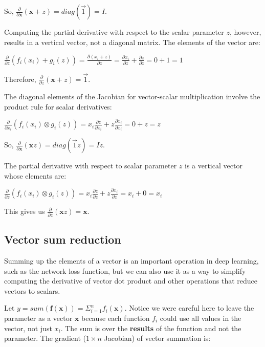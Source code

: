 \documentclass[11pt]{article}
\begin{document}
So, $\frac{\partial}{\partial \mathbf{x}} ( \mathbf{x} + z ) = diag(\vec{1}) = I$.

Computing the partial derivative with respect to the scalar parameter $z$, however, results in a vertical vector, not a diagonal matrix. The elements of the vector are:
 
$\frac{\partial}{\partial z} ( f_i(x_i) + g_i(z) ) = \frac{\partial (x_i + z)}{\partial z} = \frac{\partial x_i}{\partial z} + \frac{\partial z}{\partial z} = 0 + 1 = 1$

Therefore, $\frac{\partial}{\partial z} ( \mathbf{x} + z ) = \vec{1}$.

The diagonal elements of the Jacobian for vector-scalar multiplication involve the product rule for scalar derivatives:

$\frac{\partial}{\partial x_i} ( f_i(x_i) \otimes g_i(z) ) = x_i  \frac{\partial z}{\partial x_i} + z  \frac{\partial x_i}{\partial x_i} = 0 + z = z$

So, $\frac{\partial}{\partial \mathbf{x}} ( \mathbf{x} z ) = diag(\vec{1}  z) = I z$. 

The partial derivative with respect to scalar parameter $z$ is a vertical vector whose elements are:

$\frac{\partial}{\partial z} ( f_i(x_i) \otimes g_i(z) ) = x_i \frac{\partial z}{\partial z} + z \frac{\partial x_i}{\partial z} = x_i + 0 = x_i$

This gives us $\frac{\partial}{\partial z} ( \mathbf{x} z ) = \mathbf{x}$.

\subsection{Vector sum reduction}

Summing up the elements of a vector is an important operation in deep learning, such as the network loss function, but we can also use it as a way to simplify computing the derivative of vector dot product and other operations that reduce vectors to scalars.

Let $y = sum( \mathbf{f}(\mathbf{x})) = \Sigma_{i=1}^n f_i(\mathbf{x})$.  Notice we were careful here to leave the parameter as a vector $\mathbf{x}$ because each function $f_i$ could use all values in the vector, not just $x_i$. The sum is over the {\bf results} of the function and not the parameter. The gradient ($1 \times n$ Jacobian) of vector summation is:
\end{document}
